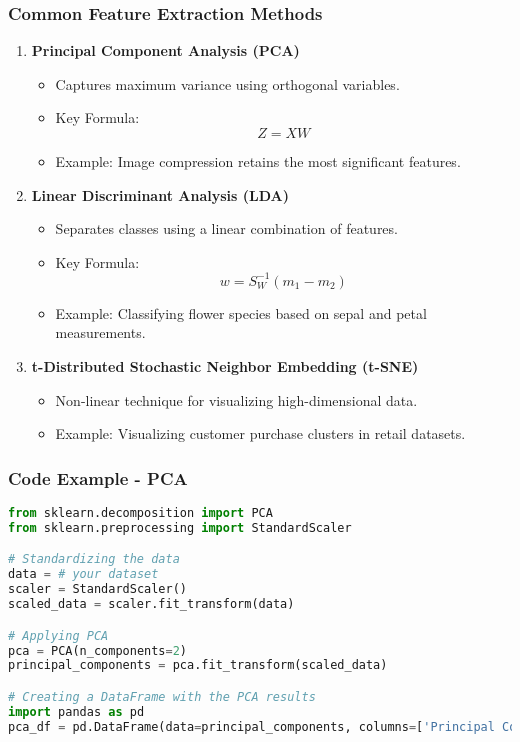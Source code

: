 \documentclass[aspectratio=169]{beamer}
\begin{document}
\begin{frame}[fragile]
    \frametitle{Common Feature Extraction Methods}
    \begin{enumerate}
        \item \textbf{Principal Component Analysis (PCA)}
            \begin{itemize}
                \item Captures maximum variance using orthogonal variables.
                \item Key Formula: 
                \begin{equation}
                    Z = XW
                \end{equation}
                \item Example: Image compression retains the most significant features.
            \end{itemize}
        
        \item \textbf{Linear Discriminant Analysis (LDA)}
            \begin{itemize}
                \item Separates classes using a linear combination of features.
                \item Key Formula: 
                \begin{equation}
                    w = S_W^{-1}(m_1 - m_2)
                \end{equation}
                \item Example: Classifying flower species based on sepal and petal measurements.
            \end{itemize}
        
        \item \textbf{t-Distributed Stochastic Neighbor Embedding (t-SNE)}
            \begin{itemize}
                \item Non-linear technique for visualizing high-dimensional data.
                \item Example: Visualizing customer purchase clusters in retail datasets.
            \end{itemize}
    \end{enumerate}
\end{frame}

\begin{frame}[fragile]
    \frametitle{Code Example - PCA}
    \begin{lstlisting}[language=Python]
from sklearn.decomposition import PCA
from sklearn.preprocessing import StandardScaler

# Standardizing the data
data = # your dataset
scaler = StandardScaler()
scaled_data = scaler.fit_transform(data)

# Applying PCA
pca = PCA(n_components=2)
principal_components = pca.fit_transform(scaled_data)

# Creating a DataFrame with the PCA results
import pandas as pd
pca_df = pd.DataFrame(data=principal_components, columns=['Principal Component 1', 'Principal Component 2'])
    \end{lstlisting}
\end{frame}
\end{document}
